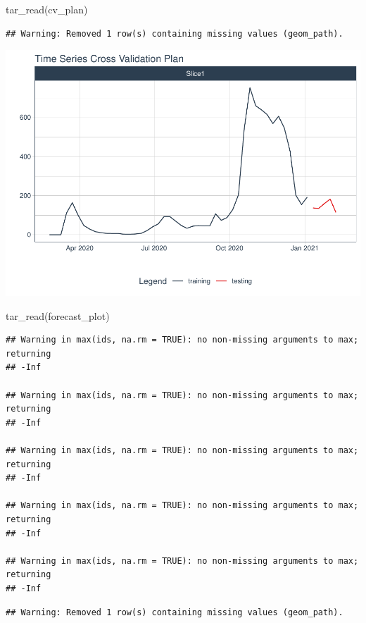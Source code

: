 \documentclass{article}
\newenvironment{Shaded}{\begin{snugshade}}{\end{snugshade}}
\newcommand{\FunctionTok}[1]{\textcolor[rgb]{0.00,0.00,0.00}{#1}}
\newcommand{\NormalTok}[1]{#1}
\begin{document}
\begin{Shaded}
\begin{Highlighting}[]
\FunctionTok{tar\_read}\NormalTok{(cv\_plan)}
\end{Highlighting}
\end{Shaded}

\begin{verbatim}
## Warning: Removed 1 row(s) containing missing values (geom_path).
\end{verbatim}

\includegraphics{paper_files/figure-latex/unnamed-chunk-4-1.pdf}

\begin{Shaded}
\begin{Highlighting}[]
\FunctionTok{tar\_read}\NormalTok{(forecast\_plot)}
\end{Highlighting}
\end{Shaded}

\begin{verbatim}
## Warning in max(ids, na.rm = TRUE): no non-missing arguments to max; returning
## -Inf

## Warning in max(ids, na.rm = TRUE): no non-missing arguments to max; returning
## -Inf

## Warning in max(ids, na.rm = TRUE): no non-missing arguments to max; returning
## -Inf

## Warning in max(ids, na.rm = TRUE): no non-missing arguments to max; returning
## -Inf

## Warning in max(ids, na.rm = TRUE): no non-missing arguments to max; returning
## -Inf
\end{verbatim}

\begin{verbatim}
## Warning: Removed 1 row(s) containing missing values (geom_path).
\end{verbatim}
\end{document}
